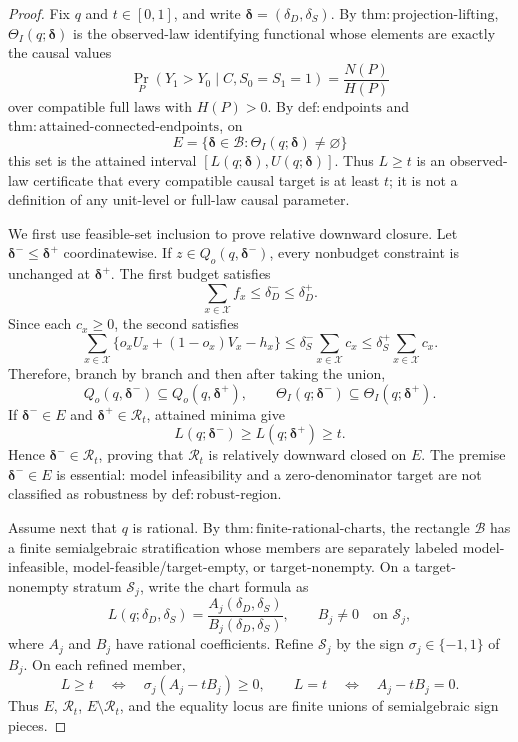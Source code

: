 \documentclass{article}
\begin{document}
\begin{proof}
Fix \(q\) and \(t\in[0,1]\), and write \(\boldsymbol\delta=(\delta_D,\delta_S)\).  By \(\mathrm{thm:projection\text{-}lifting}\), \(\Theta_I(q;\boldsymbol\delta)\) is the observed-law identifying functional whose elements are exactly the causal values
\[
 \Pr_P(Y_1>Y_0\mid C,S_0=S_1=1)=\frac{N(P)}{H(P)}
\]
over compatible full laws with \(H(P)>0\).  By \(\mathrm{def:endpoints}\) and \(\mathrm{thm:attained\text{-}connected\text{-}endpoints}\), on
\[
 E=\{\boldsymbol\delta\in\mathcal B:\Theta_I(q;\boldsymbol\delta)\neq\varnothing\}
\]
this set is the attained interval \([L(q;\boldsymbol\delta),U(q;\boldsymbol\delta)]\).  Thus \(L\geq t\) is an observed-law certificate that every compatible causal target is at least \(t\); it is not a definition of any unit-level or full-law causal parameter.

We first use feasible-set inclusion to prove relative downward closure.  Let \(\boldsymbol\delta^-\leq\boldsymbol\delta^+\) coordinatewise.  If \(z\in Q_o(q,\boldsymbol\delta^-)\), every nonbudget constraint is unchanged at \(\boldsymbol\delta^+\).  The first budget satisfies
\[
 \sum_{x\in\mathcal X}f_x
 \leq\delta_D^-
 \leq\delta_D^+.
\]
Since each \(c_x\geq0\), the second satisfies
\[
 \sum_{x\in\mathcal X}\{o_xU_x+(1-o_x)V_x-h_x\}
 \leq\delta_S^-\sum_{x\in\mathcal X}c_x
 \leq\delta_S^+\sum_{x\in\mathcal X}c_x.
\]
Therefore, branch by branch and then after taking the union,
\[
 Q_o(q,\boldsymbol\delta^-)
 \subseteq Q_o(q,\boldsymbol\delta^+),
 \qquad
 \Theta_I(q;\boldsymbol\delta^-)
 \subseteq\Theta_I(q;\boldsymbol\delta^+).
\]
If \(\boldsymbol\delta^-\in E\) and \(\boldsymbol\delta^+\in\mathcal R_t\), attained minima give
\[
 L(q;\boldsymbol\delta^-)
 \geq L(q;\boldsymbol\delta^+)
 \geq t.
\]
Hence \(\boldsymbol\delta^-\in\mathcal R_t\), proving that \(\mathcal R_t\) is relatively downward closed on \(E\).  The premise \(\boldsymbol\delta^-\in E\) is essential: model infeasibility and a zero-denominator target are not classified as robustness by \(\mathrm{def:robust\text{-}region}\).

Assume next that \(q\) is rational.  By \(\mathrm{thm:finite\text{-}rational\text{-}charts}\), the rectangle \(\mathcal B\) has a finite semialgebraic stratification whose members are separately labeled model-infeasible, model-feasible/target-empty, or target-nonempty.  On a target-nonempty stratum \(\mathcal S_j\), write the chart formula as
\[
 L(q;\delta_D,\delta_S)
 =\frac{A_j(\delta_D,\delta_S)}{B_j(\delta_D,\delta_S)},
 \qquad B_j\neq0\quad\text{on }\mathcal S_j,
\]
where \(A_j\) and \(B_j\) have rational coefficients.  Refine \(\mathcal S_j\) by the sign \(\sigma_j\in\{-1,1\}\) of \(B_j\).  On each refined member,
\[
 L\geq t
 \quad\Longleftrightarrow\quad
 \sigma_j(A_j-tB_j)\geq0,
 \qquad
 L=t
 \quad\Longleftrightarrow\quad
 A_j-tB_j=0.
\]
Thus \(E\), \(\mathcal R_t\), \(E\setminus\mathcal R_t\), and the equality locus are finite unions of semialgebraic sign pieces.


\end{proof}
\end{document}

